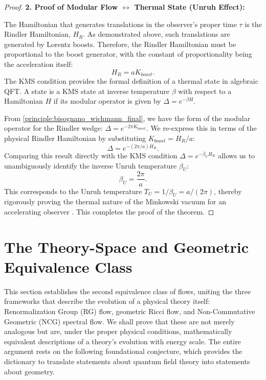 \documentclass[11pt, letterpaper]{report}
\theoremstyle{plain} %
\theoremstyle{definition} %
\theoremstyle{remark} %
\begin{document}
\begin{proof}
\textbf{2. Proof of Modular Flow $\leftrightarrow$ Thermal State (Unruh Effect):}

The Hamiltonian that generates translations in the observer's proper time $\tau$ is the Rindler Hamiltonian, $H_R$. As demonstrated above, such translations are generated by Lorentz boosts. Therefore, the Rindler Hamiltonian must be proportional to the boost generator, with the constant of proportionality being the acceleration itself:
\begin{equation}
    H_R = a K_{boost}.
\end{equation}
The KMS condition provides the formal definition of a thermal state in algebraic QFT. A state is a KMS state at inverse temperature $\beta$ with respect to a Hamiltonian $H$ if its modular operator is given by $\Delta = e^{-\beta H}$.

From \cref{principle:bisognano_wichmann_final}, we have the form of the modular operator for the Rindler wedge: $\Delta = e^{-2\pi K_{boost}}$. We re-express this in terms of the physical Rindler Hamiltonian by substituting $K_{boost} = H_R/a$:
\begin{equation}
    \Delta = e^{-(2\pi/a) H_R}.
\end{equation}
Comparing this result directly with the KMS condition $\Delta = e^{-\beta_U H_R}$ allows us to unambiguously identify the inverse Unruh temperature $\beta_U$:
\begin{equation}
    \beta_U = \frac{2\pi}{a}.
    \label{eq:beta_U_relation_final}
\end{equation}
This corresponds to the Unruh temperature $T_U = 1/\beta_U = a/(2\pi)$, thereby rigorously proving the thermal nature of the Minkowski vacuum for an accelerating observer \cite{Unruh1976}. This completes the proof of the theorem.
\end{proof}

\section{The Theory-Space and Geometric Equivalence Class}
\label{sec:theory_class_final}
This section establishes the second equivalence class of flows, uniting the three frameworks that describe the evolution of a physical theory itself: Renormalization Group (RG) flow, geometric Ricci flow, and Non-Commutative Geometric (NCG) spectral flow. We shall prove that these are not merely analogous but are, under the proper physical conditions, mathematically equivalent descriptions of a theory's evolution with energy scale. The entire argument rests on the following foundational conjecture, which provides the dictionary to translate statements about quantum field theory into statements about geometry.
\end{document}
